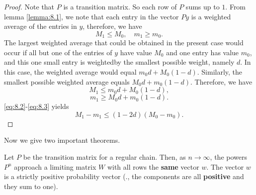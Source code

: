 \begin{proof}
Note that $P$ is a transition matrix. So each row of $P$ sums up to $1$. From lemma \ref{lemma:8.1}, we note that each entry in the vector $Py$ is a weighted average of the entries in $y$, therefore, we have
\begin{equation}
    \label{eq:8.1}
    \tag{8-1}
    M_1 \leq M_0, \quad m_1 \geq m_0.
\end{equation}
The largest weighted average that could be obtained in the present case would occur if all but one of the entries of $y$ have value $M_0$ and one entry has value $m_0$, and this one small entry is weightedby the smallest possible weight, namely $d$. In this case, the weighted average would equal $m_0 d + M_0(1-d)$.
Similarly, the smallest possible weighted average equals $M_0 d + m_0(1-d)$.
Therefore, we have 
\begin{equation}
    \label{eq:8.2}
    \tag{8-2}
    M_1 \leq m_0 d + M_0(1-d),
\end{equation}
\begin{equation}
    \label{eq:8.3}
    \tag{8-3}
    m_1 \geq M_0 d + m_0(1-d). 
\end{equation}
\eqref{eq:8.2}-\eqref{eq:8.3} yields 
\begin{equation*}
    M_1 - m_1 \leq (1-2d) (M_0 - m_0).
\end{equation*}
\end{proof}

Now we give two important theorems.

\begin{theorem}
\label{thm:8.1}
Let $P$ be the transition matrix for a regular chain. Then, as $n \to \infty$, the powers $P^n$ approach a limiting matrix $W$ with all rows the \textbf{same} vector $w$. The vector $w$ is a strictly positive probability vector (\ie., the components are all \textbf{positive} and they sum to one).
\end{theorem}

